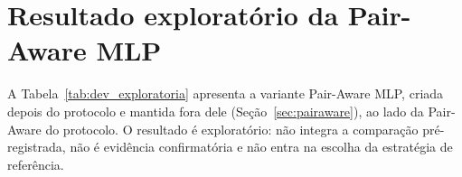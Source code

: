 \chapter[Resultado exploratório da Pair-Aware MLP]{Resultado exploratório da Pair-Aware MLP}
\label{ap:exploratoria}

A Tabela~\ref{tab:dev_exploratoria} apresenta a variante Pair-Aware MLP, criada
depois do protocolo e mantida fora dele (Seção~\ref{sec:pairaware}), ao lado da
Pair-Aware do protocolo. O resultado é exploratório: não integra a comparação
pré-registrada, não é evidência confirmatória e não entra na escolha da estratégia de
referência.


